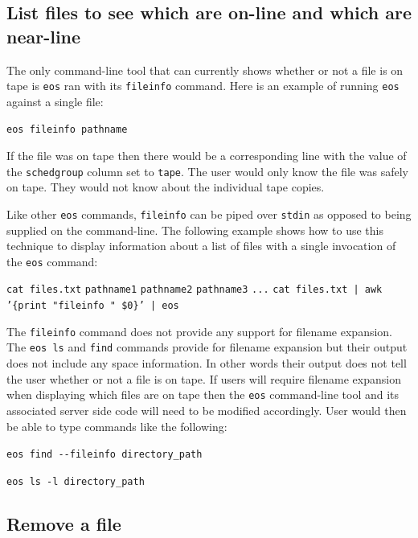 \documentclass{article}
\begin{document}
\subsection{List files to see which are on-line and which are near-line}

The only command-line tool that can currently shows whether or not a file is on tape is \texttt{eos} ran with its \texttt{fileinfo} command.  Here is an example of running \texttt{eos} against a single file:

\texttt{eos fileinfo pathname}

If the file was on tape then there would be a corresponding line with the value of the \texttt{schedgroup} column set to \texttt{tape}.  The user would only know the file was safely on tape.  They would not know about the individual tape copies.

Like other \texttt{eos} commands, \texttt{fileinfo} can be piped over \texttt{stdin} as opposed to being supplied on the command-line.  The following example shows how to use this technique to display information about a list of files with a single invocation of the \texttt{eos} command:

\texttt{cat files.txt}\newline
\texttt{pathname1}\newline
\texttt{pathname2}\newline
\texttt{pathname3}\newline
\texttt{...}\newline
\texttt{cat files.txt | awk '\{print "fileinfo " \$0\}' | eos}

The \texttt{fileinfo} command does not provide any support for filename expansion.  The \texttt{eos ls} and \texttt{find} commands provide for filename expansion but their output does not include any space information.  In other words their output does not tell the user whether or not a file is on tape.  If users will require filename expansion when displaying which files are on tape then the \texttt{eos} command-line tool and its associated server side code will need to be modified accordingly.  User would then be able to type commands like the following:

\texttt{eos find -{}-fileinfo directory\_path}

\texttt{eos ls -l directory\_path}

\subsection{Remove a file}
\end{document}
